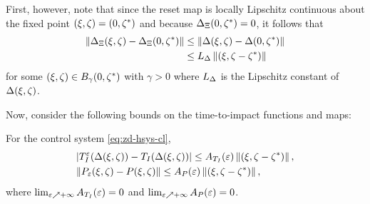 First, however, note that since the reset map is locally Lipschitz continuous
about the fixed point $(\xi, \zeta) = (0, \zeta^{*})$ and because $\Delta_{\Xi}(0, \zeta^{*}) = 0$, it
follows that
% 
\begin{align} 
  \nonumber
  \left\| \Delta_{\Xi}(\xi, \zeta) - \Delta_{\Xi}(0, \zeta^{*}) \right\| &\leq \left\| \Delta(\xi, \zeta) -
    \Delta(0, \zeta^{*}) \right\|\\
  \label{eq:impact-Lipschitz}
  &\leq L_{\Delta} \left\|(\xi, \zeta - \zeta^{*})\right\|
\end{align}
% 
for some $(\xi, \zeta) \in B_{\gamma}(0, \zeta^{*})$ with $\gamma > 0$ where $L_{\Delta}$ is the
Lipschitz constant of $\Delta(\xi, \zeta)$.

Now, consider the following bounds on the time-to-impact functions and
\Poincare{} maps:

\begin{lemma}
  \label{lemma:TIe-P-bounds}
  For the control system \eqref{eq:zd-hsys-cl},
  \begin{eqnarray*}
    &| T_{I}^{\varepsilon}(\Delta(\xi, \zeta)) - T_{I}(\Delta(\xi, \zeta)) | \leq A_{T_{I}}(\varepsilon) \left\|(\xi, \zeta - \zeta^{*})\right\|,\\
    &\| P_{\varepsilon}(\xi, \zeta) - P(\xi, \zeta) \| \leq A_{P}(\varepsilon) \left\|(\xi, \zeta - \zeta^{*})\right\|,
  \end{eqnarray*}
  where $\lim_{\varepsilon \nearrow +\infty} A_{T_{I}}(\varepsilon) = 0$ and $\lim_{\varepsilon \nearrow +\infty}A_{P}(\varepsilon) = 0$.\vgap
\end{lemma}
